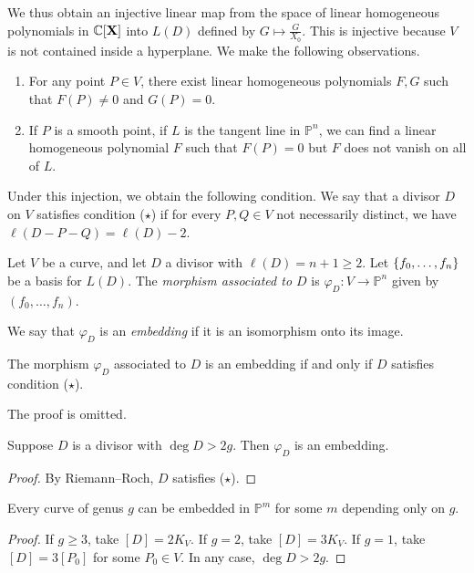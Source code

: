 We thus obtain an injective linear map from the space of linear homogeneous polynomials in \( \mathbb C[\vb X] \) into \( L(D) \) defined by \( G \mapsto \frac{G}{X_0} \).
This is injective because \( V \) is not contained inside a hyperplane.
We make the following observations.
\begin{enumerate}
    \item For any point \( P \in V \), there exist linear homogeneous polynomials \( F, G \) such that \( F(P) \neq 0 \) and \( G(P) = 0 \).
    \item If \( P \) is a smooth point, if \( L \) is the tangent line in \( \mathbb P^n \), we can find a linear homogeneous polynomial \( F \) such that \( F(P) = 0 \) but \( F \) does not vanish on all of \( L \).
\end{enumerate}
Under this injection, we obtain the following condition.
We say that a divisor \( D \) on \( V \) satisfies condition (\( \star \)) if for every \( P, Q \in V \) not necessarily distinct, we have \( \ell(D - P - Q) = \ell(D) - 2 \).
\begin{definition}
    Let \( V \) be a curve, and let \( D \) a divisor with \( \ell(D) = n + 1 \geq 2 \).
    Let \( \qty{f_0, \dots, f_n} \) be a basis for \( L(D) \).
    The \emph{morphism associated to \( D \)} is \( \varphi_D \colon V \to \mathbb P^n \) given by \( (f_0, \dots, f_n) \).
\end{definition}
We say that \( \varphi_D \) is an \emph{embedding} if it is an isomorphism onto its image.
\begin{theorem}
    The morphism \( \varphi_D \) associated to \( D \) is an embedding if and only if \( D \) satisfies condition (\( \star \)).
\end{theorem}
The proof is omitted.
\begin{corollary}
    Suppose \( D \) is a divisor with \( \deg D > 2g \).
    Then \( \varphi_D \) is an embedding.
\end{corollary}
\begin{proof}
    By Riemann--Roch, \( D \) satisfies (\( \star \)).
\end{proof}
\begin{corollary}
    Every curve of genus \( g \) can be embedded in \( \mathbb P^m \) for some \( m \) depending only on \( g \).
\end{corollary}
\begin{proof}
    If \( g \geq 3 \), take \( [D] = 2K_V \).
    If \( g = 2 \), take \( [D] = 3K_V \).
    If \( g = 1 \), take \( [D] = 3[P_0] \) for some \( P_0 \in V \).
    In any case, \( \deg D > 2g \).
\end{proof}
